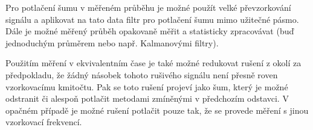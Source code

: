 Pro potlačení šumu v měřeném průběhu je možné použít velké převzorkování signálu a aplikovat na tato data filtr pro potlačení šumu mimo užitečné pásmo. Dále je možné měřený průběh opakovaně měřit a statisticky zpracovávat (buď jednoduchým průměrem nebo např. Kalmanovými filtry).

Použitím měření v ekvivalentním čase je také možné redukovat rušení z okolí za předpokladu, že žádný násobek tohoto rušivého signálu není přesně roven vzorkovacímu kmitočtu. Pak se toto rušení projeví jako šum, který je možné odstranit či alespoň potlačit metodami zmíněnými v předchozím odstavci. V opačném případě je možné rušení potlačit pouze tak, že se provede měření s jinou vzorkovací frekvencí.